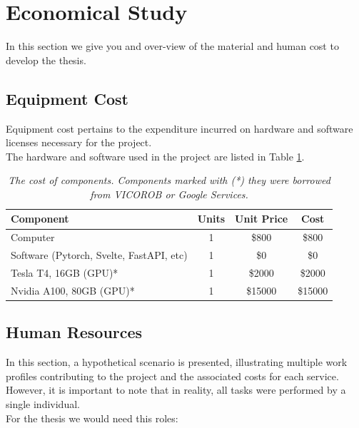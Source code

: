 \section{Economical Study}

In this section we give you and over-view of the material and human cost to
develop the thesis.

\subsection{Equipment Cost}

Equipment cost pertains to the expenditure incurred on hardware and software
licenses necessary for the project. \\

The hardware and software used in the project are listed in Table
\ref{table:equipment_cost}.

\begin{table}[H]
  \centering
  \begin{tabular}{lccc}
    \toprule
    \textbf{Component} & \textbf{Units} & \textbf{Unit Price} & \textbf{Cost} \\
    \midrule
    Computer & 1 & \$800 & \$800 \\
    Software (Pytorch, Svelte, FastAPI, etc) & 1 & \$0 & \$0 \\
    Tesla T4, 16GB (GPU)* & 1 & \$2000 & \$2000 \\
    Nvidia A100, 80GB (GPU)* & 1 & \$15000 & \$15000 \\
    \bottomrule
  \end{tabular}
  \caption[The cost of components]
  {\textit{The cost of components.
  Components marked with (*) they were borrowed from VICOROB or
  Google Services. }}
  {\label{table:equipment_cost}}
\end{table}

\subsection{Human Resources}

In this section, a hypothetical scenario is presented, illustrating multiple
work profiles contributing to the project and the associated costs for each
service. However, it is important to note that in reality, all tasks were
performed by a single individual. \\

For the thesis we would need this roles: \\

